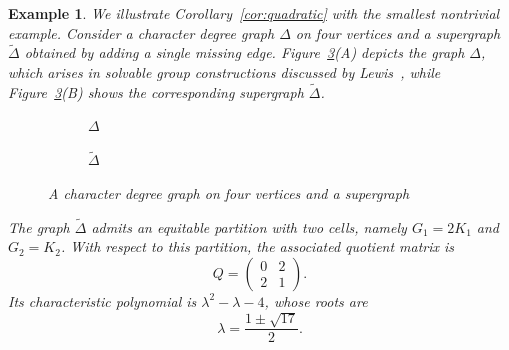 \documentclass[11pt]{amsart}
\newtheorem{exam}[thm]{\bf Example}
\begin{document}
\begin{exam}\label{ex:4vertex}
We illustrate Corollary~\ref{cor:quadratic} with the smallest nontrivial example. Consider a character degree graph $\Delta$ on four vertices and a supergraph $\widetilde{\Delta}$ obtained by adding a single missing edge. Figure~\ref{fig:four-vertex-cdg}(A) depicts the graph $\Delta$, which arises in solvable group constructions discussed by Lewis~\cite[p.~184]{Lewis2008}, while Figure~\ref{fig:four-vertex-cdg}(B) shows the corresponding supergraph $\widetilde{\Delta}$.

\begin{figure}[ht]
    \centering 
    \begin{subfigure}{.45\textwidth} 
        \centering 
        \caption{$\Delta$}
        \label{fig:delta}
    \end{subfigure}
    \hfill
    \begin{subfigure}{.45\textwidth} 
        \centering 
        \caption{$\widetilde{\Delta}$}
        \label{fig:delta-tilde}
    \end{subfigure}
    \caption{A character degree graph on four vertices and a supergraph}
    \label{fig:four-vertex-cdg}
\end{figure}

The graph $\widetilde{\Delta}$ admits an equitable partition with two cells, namely $G_1 = 2K_1$ and $G_2 = K_2$. With respect to this partition, the associated quotient matrix is
\[
Q =
\begin{pmatrix}
0 & 2 \\
2 & 1
\end{pmatrix}.
\]
Its characteristic polynomial is $\lambda^2 - \lambda - 4$, whose roots are
\[
\lambda = \frac{1 \pm \sqrt{17}}{2}.
\]


\end{exam}
\end{document}
